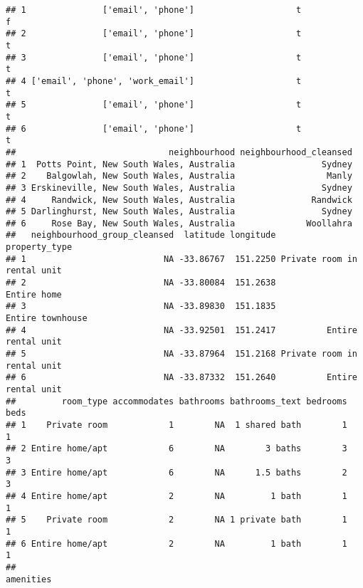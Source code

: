 \documentclass[
]{article}
\begin{document}
\begin{verbatim}
## 1               ['email', 'phone']                    t                      f
## 2               ['email', 'phone']                    t                      t
## 3               ['email', 'phone']                    t                      t
## 4 ['email', 'phone', 'work_email']                    t                      t
## 5               ['email', 'phone']                    t                      t
## 6               ['email', 'phone']                    t                      t
##                              neighbourhood neighbourhood_cleansed
## 1  Potts Point, New South Wales, Australia                 Sydney
## 2    Balgowlah, New South Wales, Australia                  Manly
## 3 Erskineville, New South Wales, Australia                 Sydney
## 4     Randwick, New South Wales, Australia               Randwick
## 5 Darlinghurst, New South Wales, Australia                 Sydney
## 6     Rose Bay, New South Wales, Australia              Woollahra
##   neighbourhood_group_cleansed  latitude longitude               property_type
## 1                           NA -33.86767  151.2250 Private room in rental unit
## 2                           NA -33.80084  151.2638                 Entire home
## 3                           NA -33.89830  151.1835            Entire townhouse
## 4                           NA -33.92501  151.2417          Entire rental unit
## 5                           NA -33.87964  151.2168 Private room in rental unit
## 6                           NA -33.87332  151.2640          Entire rental unit
##         room_type accommodates bathrooms bathrooms_text bedrooms beds
## 1    Private room            1        NA  1 shared bath        1    1
## 2 Entire home/apt            6        NA        3 baths        3    3
## 3 Entire home/apt            6        NA      1.5 baths        2    3
## 4 Entire home/apt            2        NA         1 bath        1    1
## 5    Private room            2        NA 1 private bath        1    1
## 6 Entire home/apt            2        NA         1 bath        1    1
##                                                                                                                                                                                                                                                                                                                                                                                                                                                                                                                                                                                                                                                                                                                                                                                                                                                                                                                                                                                                                                     amenities

\end{verbatim}
\end{document}
